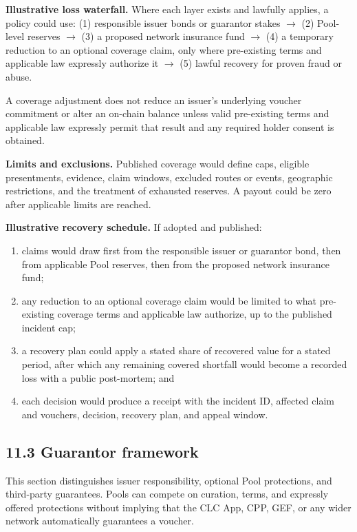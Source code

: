 \documentclass[11pt]{article}
\begin{document}
\textbf{Illustrative loss waterfall.} Where each layer exists and lawfully applies, a policy could use: (1) responsible issuer bonds or guarantor stakes $\to$ (2) Pool-level reserves $\to$ (3) a proposed network insurance fund $\to$ (4) a temporary reduction to an optional coverage claim, only where pre-existing terms and applicable law expressly authorize it $\to$ (5) lawful recovery for proven fraud or abuse.

A coverage adjustment does not reduce an issuer's underlying voucher commitment or alter an on-chain balance unless valid pre-existing terms and applicable law expressly permit that result and any required holder consent is obtained.

\textbf{Limits and exclusions.} Published coverage would define caps, eligible presentments, evidence, claim windows, excluded routes or events, geographic restrictions, and the treatment of exhausted reserves. A payout could be zero after applicable limits are reached.

\textbf{Illustrative recovery schedule.} If adopted and published:

\begin{enumerate}[leftmargin=*]
\item claims would draw first from the responsible issuer or guarantor bond, then from applicable Pool reserves, then from the proposed network insurance fund;
\item any reduction to an optional coverage claim would be limited to what pre-existing coverage terms and applicable law authorize, up to the published incident cap;
\item a recovery plan could apply a stated share of recovered value for a stated period, after which any remaining covered shortfall would become a recorded loss with a public post-mortem; and
\item each decision would produce a receipt with the incident ID, affected claim and vouchers, decision, recovery plan, and appeal window.
\end{enumerate}
\subsection*{11.3 Guarantor framework}

This section distinguishes issuer responsibility, optional Pool protections, and third-party guarantees. Pools can compete on curation, terms, and expressly offered protections without implying that the CLC App, CPP, GEF, or any wider network automatically guarantees a voucher.
\end{document}
